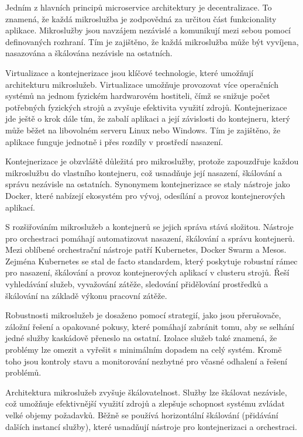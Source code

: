 Jedním z hlavních principů microservice architektury je decentralizace. To znamená, že každá mikroslužba je zodpovědná za určitou část funkcionality aplikace. Mikroslužby jsou navzájem nezávislé a komunikují mezi sebou pomocí definovaných rozhraní. Tím je zajištěno, že každá mikroslužba může být vyvíjena, nasazována a škálována nezávisle na ostatních.


Virtualizace a kontejnerizace jsou klíčové technologie, které umožňují architekturu mikroslužeb. Virtualizace umožňuje provozovat více operačních systémů na jednom fyzickém hardwarovém hostiteli, čímž se snižuje počet potřebných fyzických strojů a zvyšuje efektivita využití zdrojů. Kontejnerizace jde ještě o krok dále tím, že zabalí aplikaci a její závislosti do kontejneru, který může běžet na libovolném serveru Linux nebo Windows. Tím je zajištěno, že aplikace funguje jednotně i přes rozdíly v prostředí nasazení.

Kontejnerizace je obzvláště důležitá pro mikroslužby, protože zapouzdřuje každou mikroslužbu do vlastního kontejneru, což usnadňuje její nasazení, škálování a správu nezávisle na ostatních. Synonymem kontejnerizace se staly nástroje jako Docker, které nabízejí ekosystém pro vývoj, odesílání a provoz kontejnerových aplikací.


S rozšiřováním mikroslužeb a kontejnerů se jejich správa stává složitou. Nástroje pro orchestraci pomáhají automatizovat nasazení, škálování a správu kontejnerů. Mezi oblíbené orchestrační nástroje patří Kubernetes, Docker Swarm a Mesos. Zejména Kubernetes se stal de facto standardem, který poskytuje robustní rámec pro nasazení, škálování a provoz kontejnerových aplikací v clusteru strojů. Řeší vyhledávání služeb, vyvažování zátěže, sledování přidělování prostředků a škálování na základě výkonu pracovní zátěže.


Robustnosti mikroslužeb je dosaženo pomocí strategií, jako jsou přerušovače, záložní řešení a opakované pokusy, které pomáhají zabránit tomu, aby se selhání jedné služby kaskádově přeneslo na ostatní. Izolace služeb také znamená, že problémy lze omezit a vyřešit s minimálním dopadem na celý systém. Kromě toho jsou kontroly stavu a monitorování nezbytné pro včasné odhalení a řešení problémů.


Architektura mikroslužeb zvyšuje škálovatelnost. Služby lze škálovat nezávisle, což umožňuje efektivnější využití zdrojů a zlepšuje schopnost systému zvládat velké objemy požadavků. Běžně se používá horizontální škálování (přidávání dalších instancí služby), které usnadňují nástroje pro kontejnerizaci a orchestraci.

